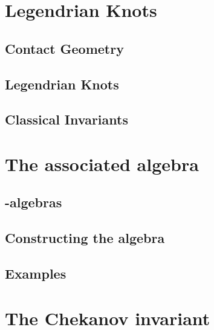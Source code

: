 
    \chapter{Legendrian Knots}
 
    \section{Contact Geometry}
    
 
    \section{Legendrian Knots}
    
    
    \section{Classical Invariants}
 
    \chapter{The associated \Ainf algebra}
    \label{chap:assic_a_alg}

    \section{\Ainf-algebras}
    
    
    \section{Constructing the \Ainf algebra} 
    \label{sect:a_inf_alg_const}
    
    
    \section{Examples}
    
    
    \chapter{The Chekanov invariant}

